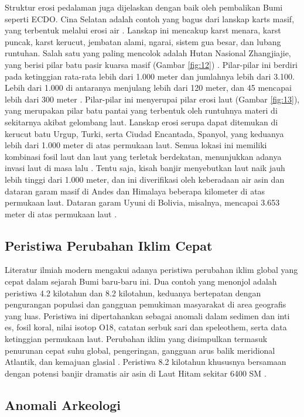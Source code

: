 \documentclass[10pt,twocolumn,letterpaper]{article}
\begin{document}
Struktur erosi pedalaman juga dijelaskan dengan baik oleh pembalikan Bumi seperti ECDO. Cina Selatan adalah contoh yang bagus dari lanskap karts masif, yang terbentuk melalui erosi air \cite{82}. Lanskap ini mencakup karst menara, karst puncak, karst kerucut, jembatan alami, ngarai, sistem gua besar, dan lubang runtuhan. Salah satu yang paling mencolok adalah Hutan Nasional Zhangjiajie, yang berisi pilar batu pasir kuarsa masif (Gambar \ref{fig:12}) \cite{84}. Pilar-pilar ini berdiri pada ketinggian rata-rata lebih dari 1.000 meter dan jumlahnya lebih dari 3.100. Lebih dari 1.000 di antaranya menjulang lebih dari 120 meter, dan 45 mencapai lebih dari 300 meter \cite{85}. Pilar-pilar ini menyerupai pilar erosi laut (Gambar \ref{fig:13}), yang merupakan pilar batu pantai yang terbentuk oleh runtuhnya materi di sekitarnya akibat gelombang laut. Lanskap erosi serupa dapat ditemukan di kerucut batu Urgup, Turki, serta Ciudad Encantada, Spanyol, yang keduanya lebih dari 1.000 meter di atas permukaan laut. Semua lokasi ini memiliki kombinasi fosil laut dan laut yang terletak berdekatan, menunjukkan adanya invasi laut di masa lalu \cite{15,86,87}. Tentu saja, kisah banjir \cite{3} menyebutkan laut naik jauh lebih tinggi dari 1.000 meter, dan ini diverifikasi oleh keberadaan air asin dan dataran garam masif di Andes dan Himalaya beberapa kilometer di atas permukaan laut. Dataran garam Uyuni di Bolivia, misalnya, mencapai 3.653 meter di atas permukaan laut \cite{94}.

\subsection{Peristiwa Perubahan Iklim Cepat}

Literatur ilmiah modern mengakui adanya peristiwa perubahan iklim global yang cepat dalam sejarah Bumi baru-baru ini. Dua contoh yang menonjol adalah peristiwa 4.2 kilotahun dan 8.2 kilotahun, keduanya bertepatan dengan pengurangan populasi dan gangguan pemukiman masyarakat di area geografis yang luas. Peristiwa ini dipertahankan sebagai anomali dalam sedimen dan inti es, fosil koral, nilai isotop O18, catatan serbuk sari dan speleothem, serta data ketinggian permukaan laut. Perubahan iklim yang disimpulkan termasuk penurunan cepat suhu global, pengeringan, gangguan arus balik meridional Atlantik, dan kemajuan glasial \cite{90,91,92}. Peristiwa 8.2 kilotahun khususnya bersamaan dengan potensi banjir dramatis air asin di Laut Hitam sekitar 6400 SM \cite{93}.

\subsection{Anomali Arkeologi}
\end{document}
